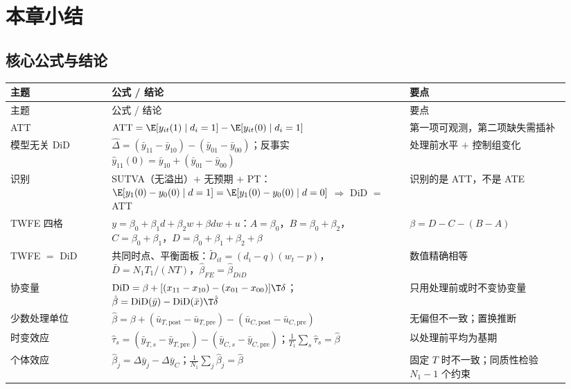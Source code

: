 \section{本章小结}\label{sec:U15b-summary}

\subsection{核心公式与结论}

{\small
\begin{longtable}{@{}p{0.17\linewidth}p{0.50\linewidth}p{0.27\linewidth}@{}}
\toprule
主题 & 公式 / 结论 & 要点\\
\midrule
\endfirsthead
\toprule
主题 & 公式 / 结论 & 要点\\
\midrule
\endhead
\bottomrule
\endfoot
ATT & $\mathrm{ATT}=\E[y_{it}(1)\mid d_i=1]-\E[y_{it}(0)\mid d_i=1]$ & 第一项可观测，第二项缺失需插补\\
模型无关 DiD & $\hat\Delta=(\bar y_{11}-\bar y_{10})-(\bar y_{01}-\bar y_{00})$；反事实 $\hat y_{11}(0)=\bar y_{10}+(\bar y_{01}-\bar y_{00})$ & 处理前水平 $+$ 控制组变化\\
识别 & SUTVA（无溢出）$+$ 无预期 $+$ PT：$\E[y_1(0)-y_0(0)\mid d=1]=\E[y_1(0)-y_0(0)\mid d=0]$ $\Rightarrow$ DiD $=$ ATT & 识别的是 ATT，不是 ATE\\
TWFE 四格 & $y=\beta_0+\beta_1d+\beta_2w+\beta dw+u$：$A=\beta_0$，$B=\beta_0+\beta_2$，$C=\beta_0+\beta_1$，$D=\beta_0+\beta_1+\beta_2+\beta$ & $\beta=D-C-(B-A)$\\
TWFE $=$ DiD & 共同时点、平衡面板：$\tilde D_{it}=(d_i-q)(w_t-p)$，$\bar D=N_1T_1/(NT)$，$\hat\beta_{FE}=\hat\beta_{DiD}$ & 数值精确相等\\
协变量 & $\mathrm{DiD}=\beta+[(x_{11}-x_{10})-(x_{01}-x_{00})]\T\delta$；$\hat\beta=\mathrm{DiD}(\bar y)-\mathrm{DiD}(\bar x)\T\hat\delta$ & 只用处理前或时不变协变量\\
少数处理单位 & $\hat\beta=\beta+(\bar u_{T,\mathrm{post}}-\bar u_{T,\mathrm{pre}})-(\bar u_{C,\mathrm{post}}-\bar u_{C,\mathrm{pre}})$ & 无偏但不一致；置换推断\\
时变效应 & $\hat\tau_s=(\bar y_{T,s}-\bar y_{T,\mathrm{pre}})-(\bar y_{C,s}-\bar y_{C,\mathrm{pre}})$；$\frac1{T_1}\sum_s\hat\tau_s=\hat\beta$ & 以处理前平均为基期\\
个体效应 & $\hat\beta_j=\Delta\bar y_j-\Delta\bar y_C$；$\frac1{N_1}\sum_j\hat\beta_j=\hat\beta$ & 固定 $T$ 时不一致；同质性检验 $N_1-1$ 个约束\\

\end{longtable}}
